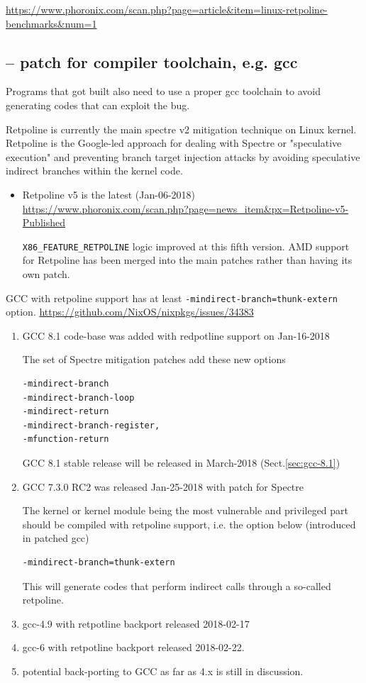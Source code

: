 \url{https://www.phoronix.com/scan.php?page=article&item=linux-retpoline-benchmarks&num=1}

\subsection{-- patch for compiler toolchain, e.g. gcc}
\label{sec:GCC-patched-Spectre}

Programs that got built also need to use a proper gcc toolchain to avoid
generating codes that can exploit the bug.

Retpoline is currently the main spectre v2 mitigation technique on Linux kernel.
Retpoline is the Google-led approach for dealing with Spectre or "speculative
execution" and preventing branch target injection attacks by avoiding
speculative indirect branches within the kernel code. 
\begin{itemize}
  \item  Retpoline v5 is the latest (Jan-06-2018)
  \url{https://www.phoronix.com/scan.php?page=news_item&px=Retpoline-v5-Published}
  
\verb!X86_FEATURE_RETPOLINE! logic improved at this fifth version.
AMD support for Retpoline has been merged into the main patches rather than
having its own patch.
  
\end{itemize}

GCC with retpoline support has at least \verb!-mindirect-branch=thunk-extern!
option. \url{https://github.com/NixOS/nixpkgs/issues/34383}
\begin{enumerate}
  \item GCC 8.1 code-base was added with redpotline support on Jan-16-2018

The set of Spectre mitigation patches add these new options
\begin{verbatim}
-mindirect-branch 
-mindirect-branch-loop
-mindirect-return 
-mindirect-branch-register,
-mfunction-return
\end{verbatim}


GCC 8.1 stable release will be released in March-2018 (Sect.\ref{sec:gcc-8.1})  

  \item GCC 7.3.0 RC2 was released Jan-25-2018 with patch for Spectre 
  
The kernel or kernel module being the most vulnerable and privileged part should
be compiled with retpoline support, i.e. the option below (introduced in
patched gcc)
\begin{verbatim}
-mindirect-branch=thunk-extern 
\end{verbatim}  
This will generate codes that perform indirect calls through a so-called
retpoline.

  \item gcc-4.9 with retpotline backport released 2018-02-17
  
  \item gcc-6 with retpotline backport released 2018-02-22.

  \item potential back-porting to GCC as far as 4.x is still in discussion.
  
\end{enumerate}


